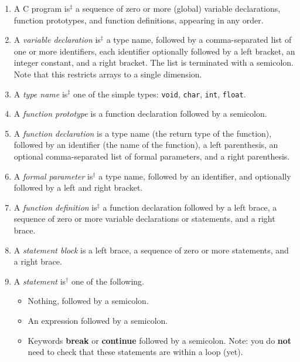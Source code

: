 \documentclass{article}
\newcommand{\iseasier}{is$^\dagger$ }
\newcommand{\isextra}{is$^\ddagger$ }
\begin{document}
\begin{enumerate}
\item\label{Cprog}
  A C program \isextra a sequence of zero or more
  (global) variable declarations, function prototypes, and function definitions,
  appearing in any order.

\item\label{vardec}
  A \emph{variable declaration} \isextra a type name,
  followed by a comma-separated list of one or more identifiers,
  each identifier optionally followed by a left bracket,
  an integer constant, and a right bracket.
  The list is terminated with a semicolon.
  Note that this restricts arrays to a single dimension.

\item\label{typename}
  A \emph{type name} \isextra one of the simple types:
    {\tt void}, {\tt char}, {\tt int}, {\tt float}.

\item
  A \emph{function prototype} is a function declaration
  followed by a semicolon.

\item
  A \emph{function declaration} is a type name
  (the return type of the function),
  followed by an identifier (the name of the function),
  a left parenthesis,
    an optional comma-separated list of formal parameters,
  and a right parenthesis.

\item
  A \emph{formal parameter} \iseasier a type name,
  followed by an identifier,
  and optionally followed by a left and right bracket.

\item \label{funcdef}
  A \emph{function definition} \isextra a function declaration
  followed by a left brace,
  a sequence of zero or more
    variable declarations or statements,
  and a right brace.

\item
  A \emph{statement block} is a left brace,
  a sequence of zero or more statements,
  and a right brace.

\item
  A \emph{statement} \iseasier one of the following.

  \begin{itemize}
    \item Nothing, followed by a semicolon.
    \item An expression followed by a semicolon.

    \item Keywords {\bf break} or {\bf continue} followed by a semicolon.
    Note: you do {\bf not} need to check that these statements
      are within a loop (yet).


\end{itemize}
\end{enumerate}
\end{document}
